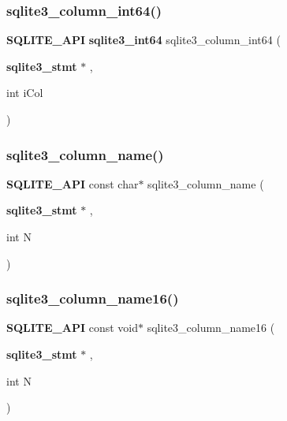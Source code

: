 \mbox{\label{sqlite3_8h_a39f0c222a27bd9c4cb73d07e9e48ffe6}} 
\subsubsection{sqlite3\_column\_int64()}
{\footnotesize\ttfamily \textbf{ S\+Q\+L\+I\+T\+E\+\_\+\+A\+PI} \textbf{ sqlite3\+\_\+int64} sqlite3\+\_\+column\+\_\+int64 (\begin{DoxyParamCaption}\item[{\textbf{ sqlite3\+\_\+stmt} $\ast$}]{,  }\item[{int}]{i\+Col }\end{DoxyParamCaption})}

\mbox{\label{sqlite3_8h_a01def208cc0075b490ec34c00e7b4294}} 
\subsubsection{sqlite3\_column\_name()}
{\footnotesize\ttfamily \textbf{ S\+Q\+L\+I\+T\+E\+\_\+\+A\+PI} const char$\ast$ sqlite3\+\_\+column\+\_\+name (\begin{DoxyParamCaption}\item[{\textbf{ sqlite3\+\_\+stmt} $\ast$}]{,  }\item[{int}]{N }\end{DoxyParamCaption})}

\mbox{\label{sqlite3_8h_a1540664748cbe88571223f3da1d92616}} 
\subsubsection{sqlite3\_column\_name16()}
{\footnotesize\ttfamily \textbf{ S\+Q\+L\+I\+T\+E\+\_\+\+A\+PI} const void$\ast$ sqlite3\+\_\+column\+\_\+name16 (\begin{DoxyParamCaption}\item[{\textbf{ sqlite3\+\_\+stmt} $\ast$}]{,  }\item[{int}]{N }\end{DoxyParamCaption})}

\mbox{\label{sqlite3_8h_ab4d846a2fc192bb35306442d9f24494b}} 
